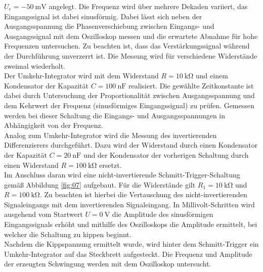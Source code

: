 $U_e = -\SI{50}{\milli\volt}$ angelegt. Die Frequenz wird über mehrere Dekaden
variiert, das Eingangssignal ist dabei sinusförmig. Dabei lässt sich  neben der Ausgangsspannung
die Phasenverschiebung zwischen Eingangs- und Ausgangssignal mit dem
Oszilloskop messen und die erwartete Abnahme für hohe Frequenzen untersuchen.
Zu beachten ist, dass das Verstärkungssignal während der
Durchführung unverzerrt ist. Die Messung wird für verschiedene Widerstände
zweimal wiederholt. \\
\noindent Der Umkehr-Integrator wird mit dem Widerstand $R = \SI{10}{\kilo\ohm}$
und einem Kondensator der Kapazität $C = \SI{100}{\nano\farad}$ realisiert.
Die gewählte Zeitkonstante ist dabei durch Untersuchung der Proportionalität
zwischen Ausgangsspannung und dem Kehrwert der Frequenz (sinusförmiges
Eingangssignal) zu prüfen. Gemessen werden bei dieser Schaltung die Eingangs-
und Ausgangsspannungen in Abhängigkeit von der Frequenz. \\
\noindent Analog zum Umkehr-Integrator wird die Messung des invertierenden
Differenzierers durchgeführt. Dazu wird der Widerstand durch einen Kondensator
der Kapazität $C = \SI{20}{\nano\farad}$ und der Kondensator der vorherigen
Schaltung durch einen Widerstand $R = \SI{100}{\kilo\ohm}$ ersetzt. \\
\noindent Im Anschluss daran wird eine nicht-invertierende
Schmitt-Trigger-Schaltung gemäß Abbildung \ref{fig:07} aufgebaut. Für die
Widerstände gilt $R_1 = \SI{10}{\kilo\ohm}$ und $R = \SI{100}{\kilo\ohm}$.
Zu beachten ist hierbei die Vertauschung des nicht-invertierenden Signaleingangs
mit dem invertierenden Signaleingang. In Millivolt-Schritten wird ausgehend vom
Startwert $U = \SI{0}{\volt}$ die Amplitude des sinusförmigen Eingangssignals
erhöht und mithilfe des Oszilloskops die Amplitude ermittelt, bei welcher
die Schaltung zu kippen beginnt. \\
\noindent Nachdem die Kippspannung ermittelt wurde, wird hinter dem
Schmitt-Trigger ein Umkehr-Integrator auf das Steckbrett aufgesteckt. Die
Frequenz und Amplitude der erzeugten Schwingung werden mit dem Oszilloskop
untersucht.

